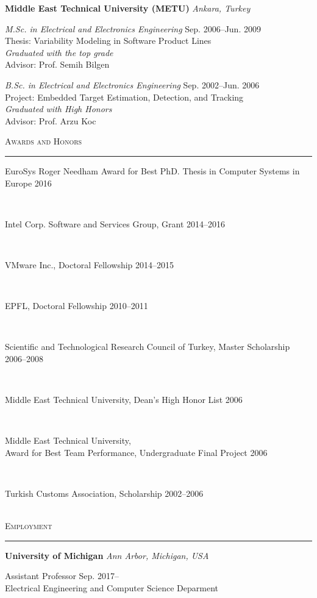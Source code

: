\documentclass[10pt]{article}
\newcommand{\mysec}[1]{\vspace{2em}\textsc{\large #1}\vspace{1mm}\hrule\vspace{2mm}}
\newcommand{\mysub}[3]{\textbf{#1} {#2} \hfill {\em #3}}
\newcommand{\myssub}[1]{\hspace*{2mm}\parbox{163mm}{#1}\vspace*{2mm}}
\begin{document}
\mysub{Middle East Technical University (METU)}{}{Ankara, Turkey} \vspace*{1mm} \\
\myssub{\vspace{2mm}\textit{M.Sc. in Electrical and Electronics Engineering} \hfill Sep. 2006--Jun. 2009 \\
Thesis:  Variability Modeling in Software Product Lines \\
{\textit{Graduated with the top grade}} \\
Advisor: Prof. Semih Bilgen} \vspace*{1mm}

\myssub{\textit{B.Sc. in Electrical and Electronics Engineering} \hfill Sep. 2002--Jun. 2006 \\
Project: Embedded Target Estimation, Detection, and Tracking\\
{\textit{Graduated with High Honors}} \\
Advisor: Prof. Arzu Koc}

\newpage

\mysec{Awards and Honors}

\myssub{EuroSys Roger Needham Award for Best PhD. Thesis in Computer Systems in Europe \hfill 2016} \\
\myssub{Intel Corp. Software and Services Group, Grant \hfill 2014--2016} \\
\myssub{VMware Inc., Doctoral Fellowship \hfill 2014--2015} \\
\myssub{EPFL, Doctoral Fellowship \hfill 2010--2011} \\
\myssub{Scientific and Technological Research Council of Turkey, Master Scholarship \hfill 2006--2008} \\
\myssub{Middle East Technical University, Dean's High Honor List \hfill 2006} \\
\myssub{Middle East Technical University, \\ Award for Best Team Performance, Undergraduate Final Project  \hfill 2006} \\
\myssub{Turkish Customs Association, Scholarship \hfill 2002--2006} \\

\mysec{Employment}

\mysub{University of Michigan}{}{Ann Arbor, Michigan, USA} \\
\myssub{Assistant Professor\vspace{1mm} \hfill Sep. 2017-- \\
Electrical Engineering and Computer Science Deparment}
\end{document}
